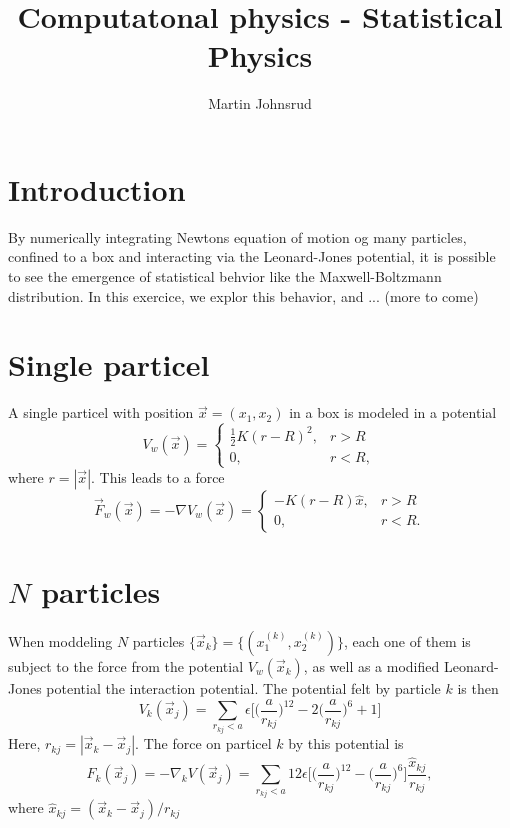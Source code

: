 \documentclass{article}
\title{Computatonal physics - Statistical Physics}
\author{Martin Johnsrud}
\begin{document}
    \maketitle
    
    \section*{Introduction}
    By numerically integrating Newtons equation of motion og many particles, confined to a box and interacting via the Leonard-Jones potential, it is possible to see the emergence of statistical behvior like the Maxwell-Boltzmann distribution. In this exercice, we explor this behavior, and ... (more to come)

    \section*{Single particel}
    A single particel with position $\vec x = (x_1, x_2)$ in a box is modeled in a potential 
    \begin{equation*}
        V_w(\vec x) = 
        \begin{cases}
            \frac{1}{2}K(r - R)^2, & r > R \\
            0, & r < R,
        \end{cases}
    \end{equation*}
    where $r = |\vec x|$. This leads to a force 
    \begin{equation*}
        \vec F_w(\vec x) = -\nabla V_w(\vec x) = 
        \begin{cases}
            -K(r - R)\hat x, & r>R \\
            0, & r<R.
        \end{cases}
    \end{equation*}

    \section*{$N$ particles}
    When moddeling $N$ particles $\{ \vec x_k\} = \{ (x_1^{(k)}, x_2^{(k)}) \}$, each one of them is subject to the force from the potential $V_w(\vec x_k)$, as well as a modified Leonard-Jones potential the interaction potential. The potential felt by particle $k$ is then
    \begin{equation*}
        V_k(\vec x_j) = 
        \sum_{r_{kj}<a}\epsilon \bigg[ \bigg( \frac{a}{r_{kj}}\bigg)^{12} - 2\bigg(\frac{a}{r_{kj}}\bigg)^{6} + 1 \bigg]
    \end{equation*}
    Here, $r_{kj} = |\vec x_k - \vec x_j|$. The force on particel $k$ by this potential is
    \begin{equation*}
        F_k (\vec x_j) = -\nabla_k V(\vec x_j) = \sum_{r_{kj}<a} 12 \epsilon \bigg[ \bigg( \frac{a}{r_{kj}}\bigg)^{12} - \bigg(\frac{a}{r_{kj}}\bigg)^{6}\bigg] \frac{\hat x_{kj}}{r_{kj}},
    \end{equation*}
    where $\hat x_{kj} = (\vec x_k - \vec x_j) / r_{kj}$
\end{document}

